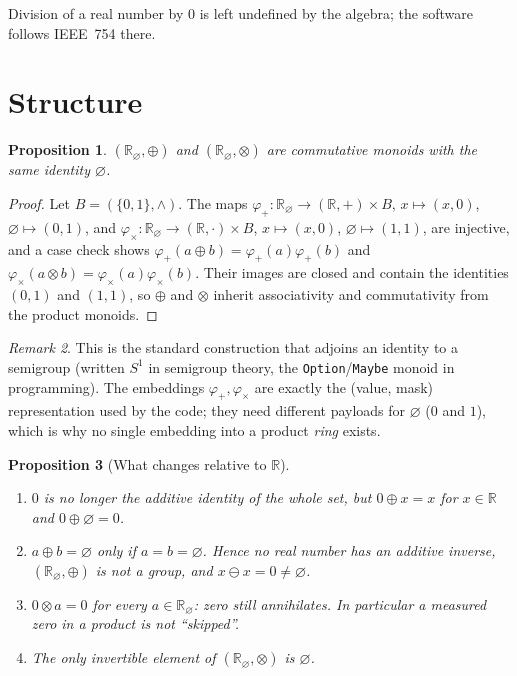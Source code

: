 \documentclass[11pt,a4paper]{article}
\newtheorem{proposition}{Proposition}
\theoremstyle{definition}
\theoremstyle{remark}
\newtheorem{remark}[proposition]{Remark}
\newcommand{\R}{\mathbb{R}}
\newcommand{\Rn}{\R_{\varnothing}}
\newcommand{\nul}{\varnothing}
\newcommand{\op}{\oplus}
\newcommand{\ot}{\otimes}
\begin{document}
Division of a real number by $0$ is left undefined by the algebra; the
software follows IEEE~754 there.

\section{Structure}

\begin{proposition}\label{prop:monoids}
$(\Rn,\op)$ and $(\Rn,\ot)$ are commutative monoids with the same identity
$\nul$.
\end{proposition}
\begin{proof}
Let $B=(\{0,1\},\wedge)$. The maps
$\varphi_+:\Rn\to(\R,+)\times B$, $x\mapsto(x,0)$, $\nul\mapsto(0,1)$, and
$\varphi_\times:\Rn\to(\R,\cdot)\times B$, $x\mapsto(x,0)$, $\nul\mapsto(1,1)$,
are injective, and a case check shows
$\varphi_+(a\op b)=\varphi_+(a)\varphi_+(b)$ and
$\varphi_\times(a\ot b)=\varphi_\times(a)\varphi_\times(b)$. Their images are
closed and contain the identities $(0,1)$ and $(1,1)$, so $\op$ and $\ot$
inherit associativity and commutativity from the product monoids.
\end{proof}

\begin{remark}
This is the standard construction that adjoins an identity to a semigroup
(written $S^1$ in semigroup theory, the \texttt{Option}/\texttt{Maybe} monoid
in programming). The embeddings $\varphi_+,\varphi_\times$ are exactly the
(value, mask) representation used by the code; they need different payloads
for $\nul$ ($0$ and $1$), which is why no single embedding into a product
\emph{ring} exists.
\end{remark}

\begin{proposition}[What changes relative to $\R$]\label{prop:loss}
\begin{enumerate}
\item $0$ is no longer the additive identity of the whole set, but
      $0\op x=x$ for $x\in\R$ and $0\op\nul=0$.
\item $a\op b=\nul$ only if $a=b=\nul$. Hence no real number has an additive
      inverse, $(\Rn,\op)$ is not a group, and $x\ominus x=0\neq\nul$.
\item $0\ot a=0$ for every $a\in\Rn$: zero still annihilates. In particular a
      measured zero in a product is not ``skipped''.
\item The only invertible element of $(\Rn,\ot)$ is $\nul$.
\end{enumerate}
\end{proposition}
\end{document}
